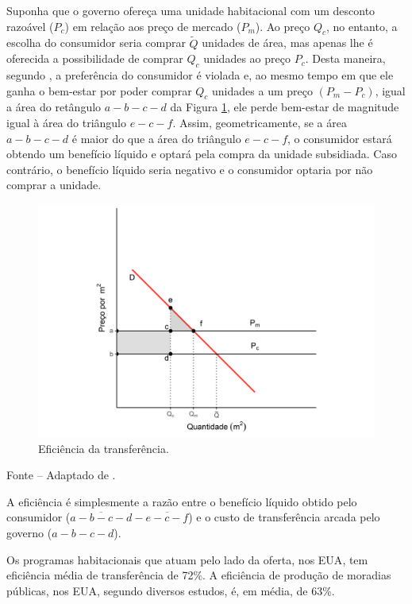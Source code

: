 \documentclass[
	12pt,				%
	oneside,			%
	a4paper,			%
	chapter=TITLE,		%
	section=TITLE,		%
	english,			%
	brazil				%
	]{abntex2}
\newcommand{\bcenter}{\begin{center}}
\newcommand{\ecenter}{\end{center}}
\begin{document}
\begin{refsection}
Suponha que o governo ofereça uma unidade habitacional com um desconto razoável
(\(P_c\)) em relação aos preço de mercado (\(P_m\)). Ao preço \(Q_c\), no entanto, a
escolha do consumidor seria comprar \(\tilde{Q}\) unidades de área, mas apenas lhe
é oferecida a possibilidade de comprar \(Q_c\) unidades ao preço \(P_c\). Desta
maneira, segundo \textcite{malpezzi_affordable_2018_1}, a preferência do consumidor é
violada e, ao mesmo tempo em que ele ganha o bem-estar por poder comprar \(Q_c\)
unidades a um preço \((P_m-P_c)\), igual a área do retângulo \(a-b-c-d\) da Figura
\ref{fig:eficiencia}, ele perde bem-estar de magnitude igual à área do
triângulo \(e-c-f\). Assim, geometricamente, se a área \(a-b-c-d\) é maior do que a
área do triângulo \(e-c-f\), o consumidor estará obtendo um benefício líquido e
optará pela compra da unidade subsidiada. Caso contrário, o benefício líquido
seria negativo e o consumidor optaria por não comprar a unidade.
\begin{figure}[H]

{\centering \includegraphics[width=0.7\linewidth]{images/eficiencia-1} 

}

\caption{Eficiência da transferência.}\label{fig:eficiencia}
\end{figure}
\bcenter

\small Fonte -- Adaptado de \textcite{malpezzi_affordable_2018_1}.
\ecenter

A eficiência é simplesmente a razão entre o benefício líquido obtido pelo
consumidor (\(\overline{a-b-c-d} - \overline{e-c-f}\)) e o custo de transferência
arcada pelo governo (\(a-b-c-d\)).

Os programas habitacionais que atuam pelo lado da oferta, nos \gls{EUA}, tem
eficiência média de transferência de 72\%. A eficiência de produção de moradias
públicas, nos \gls{EUA}, segundo diversos estudos, é, em média, de 63\%.


\end{refsection}
\end{document}
